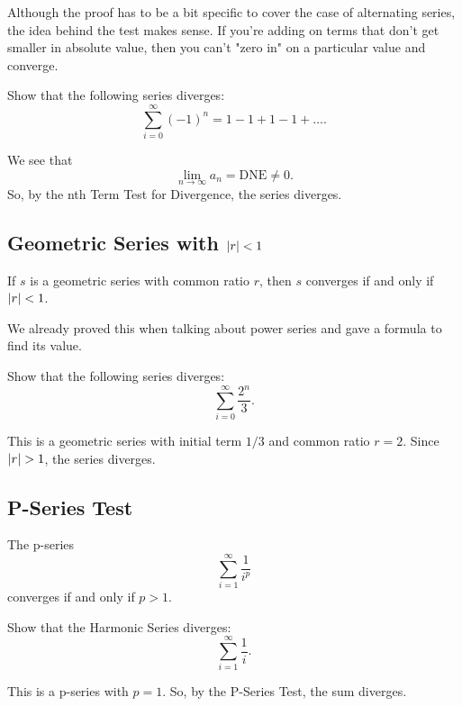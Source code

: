\noindent
Although the proof has to be a bit specific to cover the case of alternating series, the idea behind the test makes sense.
If you're adding on terms that don't get smaller in absolute value, then you can't "zero in" on a particular value and converge.

\begin{example}
	Show that the following series diverges:
	\begin{equation*}
		\sum_{i=0}^{\infty}{(-1)^n} = 1 - 1 + 1 - 1 + \ldots.
	\end{equation*}
\end{example}
We see that
\begin{equation*}
	\lim_{n\to\infty}{a_n} = \text{DNE} \neq 0.
\end{equation*}
\indent
So, by the nth Term Test for Divergence, the series diverges.

\subsection{Geometric Series with $\lvert r \rvert < 1$}
\begin{lemma}
	If $s$ is a geometric series with common ratio $r$, then $s$ converges if and only if $\lvert r \rvert < 1$.
\end{lemma}
\noindent
We already proved this when talking about power series and gave a formula to find its value.

\begin{example}
	Show that the following series diverges:
	\begin{equation*}
		\sum_{i=0}^{\infty}{\frac{2^n}{3}}.
	\end{equation*}	
\end{example}
This is a geometric series with initial term $1/3$ and common ratio $r=2$.
Since $\lvert r \rvert > 1$, the series diverges.

\subsection{P-Series Test}
\begin{lemma}
	The p-series
	\begin{equation*}
		\sum_{i=1}^{\infty}{\frac{1}{i^p}}
	\end{equation*}
	converges if and only if $p > 1$.
\end{lemma}

\begin{example}
	Show that the Harmonic Series diverges:
	\begin{equation*}
		\sum_{i=1}^{\infty}{\frac{1}{i}}.
	\end{equation*}
\end{example}
\indent
This is a p-series with $p=1$.
So, by the P-Series Test, the sum diverges.


